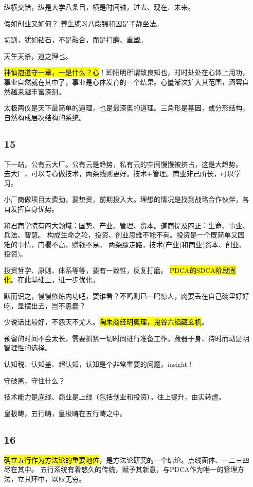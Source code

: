 纵横交错，纵是大学八条目，横是时间轴，过去、现在、未来。

假如创业又如何？ 养生练习八段锦和因是子静坐法。

切割，犹如钻石，不是融合，而是打磨、重塑。

天生天杀，道之理也。

\hl{神仙抱道守一章，一是什么？心}！即阳明所谓致良知也，时时处处在心体上用功，
事业自然就在其中了，事业是心体发育的一个结果。心量渐次扩大其范围，涵容自然越来越丰富深刻。

太极两仪是天下最简单的道理，也是最深奥的道理。三角形是基因，或分形结构，自然构成层次结构的系统。

\subsection{15}

下一站，公有云大厂。公有云是趋势，私有云的空间慢慢被挤占，这是大趋势。
去大厂，可以专心做技术，两条线则更好。技术+管理。商业非己所长，可以学习。

小厂商做项目太费劲，要垫资，前期投入大。理想的情况是找到战略合作伙伴，各自发挥自身优势。

和君商学院有四大领域：国势、产业、管理、资本。道商提及四正：生命、事业、兵法、智慧。
构成生命之轮，投资、创业思维不能不有。投资是一个既简单又困难的事情，门欄不高，赚钱不易。
两条腿走路，技术(产业)和商业(资本、创业、投资)。

投资哲学、原则、体系等等，要有一致性，反复打磨。
\hl{PDCA的SDCA阶段固化}。在此基础上，进一步优化。

默而识之，慢慢修炼内功吧，要谁看？不鸣则已一鸣惊人，肉要丢在自己碗里好好吃，显摆出去，岂不愚蠢？

少说话比较好，不怨天不尤人。\hl{陶朱商经明奥理，鬼谷六韬藏玄机}。

预留的时间不会太长，需要抓紧一切时间进行准备工作。藏器于身、待时而动是明智理性的选择。

认知税、认知差、超认知，认知是个非常重要的问题，insight！

守破离，守住什么？

技术能力是底线、商业是上线（包括创业和投资）。往上提升，由实转虚。

皇极畴，五行畴，皇极畴在五行畴之中。

\subsection{16}

\hl{确立五行作为方法论的重要地位}，是方法论研究的一个结论。点线面体、一二三四尽在其中。
五行系统有着悠久的传统，赋予其新意，与PDCA作为唯一的管理方法，立其环中，以应无穷。

